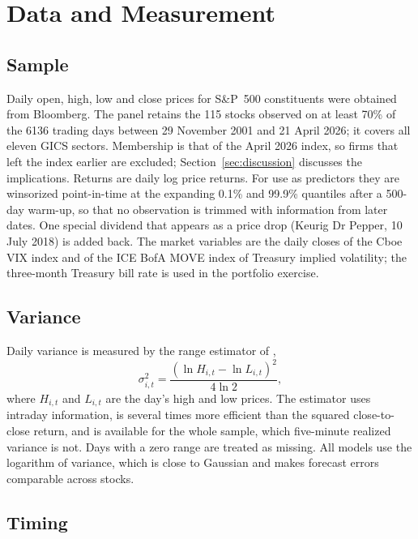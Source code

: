 \section{Data and Measurement}\label{sec:data}

\subsection{Sample}

Daily open, high, low and close prices for S\&P~500 constituents were
obtained from Bloomberg. The panel retains the 115 stocks observed on at
least 70\% of the 6136 trading days between 29 November 2001 and 21 April
2026; it covers all eleven GICS sectors. Membership is that of the April
2026 index, so firms that left the index earlier are excluded;
Section~\ref{sec:discussion} discusses the implications. Returns are daily
log price returns. For use as predictors they are winsorized point-in-time
at the expanding 0.1\% and 99.9\% quantiles after a 500-day warm-up, so that
no observation is trimmed with information from later dates. One special
dividend that appears as a price drop (Keurig Dr Pepper, 10 July 2018) is
added back. The market variables are the daily closes of the Cboe VIX index
and of the ICE BofA MOVE index of Treasury implied volatility; the
three-month Treasury bill rate is used in the portfolio exercise.

\subsection{Variance}

Daily variance is measured by the range estimator of
\citet{parkinson1980extreme},
\begin{equation}
\sigma^2_{i,t} = \frac{\left(\ln H_{i,t} - \ln L_{i,t}\right)^2}{4\ln 2},
\label{eq:parkinson}
\end{equation}
where $H_{i,t}$ and $L_{i,t}$ are the day's high and low prices. The
estimator uses intraday information, is several times more efficient than
the squared close-to-close return, and is available for the whole sample,
which five-minute realized variance is not. Days with a zero range are
treated as missing. All models use the logarithm of variance, which is close
to Gaussian and makes forecast errors comparable across stocks.

\subsection{Timing}

